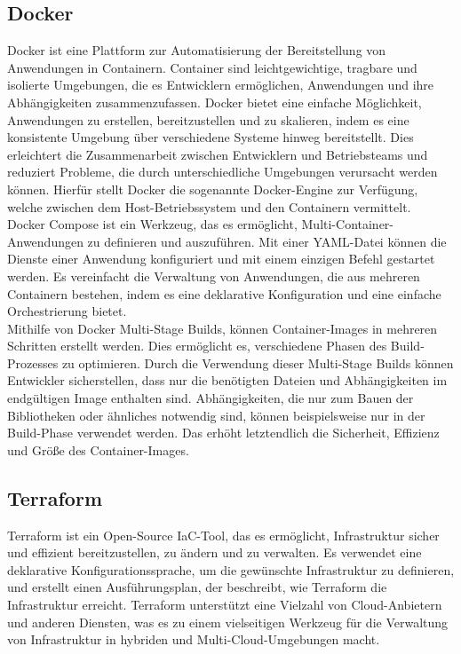 \subsection{Docker}\label{c:2_ss:docker}
Docker ist eine Plattform zur Automatisierung der Bereitstellung von Anwendungen in Containern. Container sind leichtgewichtige, tragbare und isolierte Umgebungen, die es Entwicklern ermöglichen, Anwendungen und ihre Abhängigkeiten zusammenzufassen. Docker bietet eine einfache Möglichkeit, Anwendungen zu erstellen, bereitzustellen und zu skalieren, indem es eine konsistente Umgebung über verschiedene Systeme hinweg bereitstellt. Dies erleichtert die Zusammenarbeit zwischen Entwicklern und Betriebsteams und reduziert Probleme, die durch unterschiedliche Umgebungen verursacht werden können. Hierfür stellt Docker die sogenannte Docker-Engine zur Verfügung, welche zwischen dem Host-Betriebssystem und den Containern vermittelt. 
\cite{docker}\\
Docker Compose ist ein Werkzeug, das es ermöglicht, Multi-Container-Anwendungen zu definieren und auszuführen. Mit einer YAML-Datei können die Dienste einer Anwendung konfiguriert und mit einem einzigen Befehl gestartet werden. Es vereinfacht die Verwaltung von Anwendungen, die aus mehreren Containern bestehen, indem es eine deklarative Konfiguration und eine einfache Orchestrierung bietet.
\cite{docker-compose}\\
Mithilfe von Docker Multi-Stage Builds, können Container-Images in mehreren Schritten erstellt werden. Dies ermöglicht es, verschiedene Phasen des Build-Prozesses zu optimieren. Durch die Verwendung dieser Multi-Stage Builds können Entwickler sicherstellen, dass nur die benötigten Dateien und Abhängigkeiten im endgültigen Image enthalten sind. Abhängigkeiten, die nur zum Bauen der Bibliotheken oder ähnliches notwendig sind, können beispielsweise nur in der Build-Phase verwendet werden. Das erhöht letztendlich die Sicherheit, Effizienz und Größe des Container-Images.
\cite{docker-ms}

\subsection{Terraform}\label{c:2_ss:terraform}
Terraform ist ein Open-Source \ac{IaC}-Tool, das es ermöglicht, Infrastruktur sicher und effizient bereitzustellen, zu ändern und zu verwalten. Es verwendet eine deklarative Konfigurationssprache, um die gewünschte Infrastruktur zu definieren, und erstellt einen Ausführungsplan, der beschreibt, wie Terraform die Infrastruktur erreicht. Terraform unterstützt eine Vielzahl von Cloud-Anbietern und anderen Diensten, was es zu einem vielseitigen Werkzeug für die Verwaltung von Infrastruktur in hybriden und Multi-Cloud-Umgebungen macht.
\cite{terraform}

